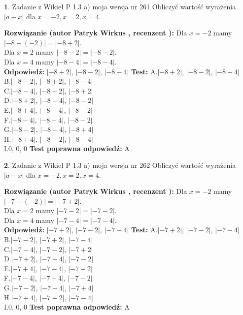 \documentclass[12pt, a4paper]{article}
\theoremstyle{definition} %
\newtheorem{zad}{}
\newcommand{\zadStart}[1]{\begin{zad}#1\newline}
\newcommand{\zadStop}{\end{zad}}
\newcommand{\rozwStart}[2]{\noindent \textbf{Rozwiązanie (autor #1 , recenzent #2): }\newline}
\newcommand{\rozwStop}{\newline}
\newcommand{\odpStart}{\noindent \textbf{Odpowiedź:}\newline}
\newcommand{\odpStop}{\newline}
\newcommand{\testStart}{\noindent \textbf{Test:}\newline}
\newcommand{\testStop}{\newline}
\newcommand{\kluczStart}{\noindent \textbf{Test poprawna odpowiedź:}\newline}
\newcommand{\kluczStop}{\newline}
\begin{document}
\zadStart{Zadanie z Wikieł P 1.3 a) moja wersja nr 261}
Obliczyć wartość wyrażenia $|a - x|$ dla $x=-2,x=2,x=4$.
\zadStop
\rozwStart{Patryk Wirkus}{}
Dla $x = -2$ mamy $|-8 - (-2)| = |-8 + 2|$.\\
Dla $x = 2$ mamy $|-8 - 2| = |-8 - 2|$.\\
Dla $x = 4$ mamy $|-8 - 4| = |-8 - 4|$.\\
\rozwStop
\odpStart
$|-8 + 2|$, $|-8 - 2|$, $|-8 - 4|$
\odpStop
\testStart
A.$|-8 + 2|$, $|-8 - 2|$, $|-8 - 4|$\\
B.$|-8 - 2|$, $|-8 + 2|$, $|-8 - 4|$\\
C.$|-8 - 4|$, $|-8 - 2|$, $|-8 + 2|$\\
D.$|-8 + 2|$, $|-8 - 4|$, $|-8 - 2|$\\
E.$|-8 + 4|$, $|-8 - 4|$, $|-8 - 2|$\\
F.$|-8 - 4|$, $|-8 + 4|$, $|-8 - 2|$\\
G.$|-8 - 2|$, $|-8 - 4|$, $|-8 + 4|$\\
H.$|-8 + 4|$, $|-8 - 2|$, $|-8 - 4|$\\
I.$0$, $0$, $0$
\testStop
\kluczStart
A
\kluczStop



\zadStart{Zadanie z Wikieł P 1.3 a) moja wersja nr 262}
Obliczyć wartość wyrażenia $|a - x|$ dla $x=-2,x=2,x=4$.
\zadStop
\rozwStart{Patryk Wirkus}{}
Dla $x = -2$ mamy $|-7 - (-2)| = |-7 + 2|$.\\
Dla $x = 2$ mamy $|-7 - 2| = |-7 - 2|$.\\
Dla $x = 4$ mamy $|-7 - 4| = |-7 - 4|$.\\
\rozwStop
\odpStart
$|-7 + 2|$, $|-7 - 2|$, $|-7 - 4|$
\odpStop
\testStart
A.$|-7 + 2|$, $|-7 - 2|$, $|-7 - 4|$\\
B.$|-7 - 2|$, $|-7 + 2|$, $|-7 - 4|$\\
C.$|-7 - 4|$, $|-7 - 2|$, $|-7 + 2|$\\
D.$|-7 + 2|$, $|-7 - 4|$, $|-7 - 2|$\\
E.$|-7 + 4|$, $|-7 - 4|$, $|-7 - 2|$\\
F.$|-7 - 4|$, $|-7 + 4|$, $|-7 - 2|$\\
G.$|-7 - 2|$, $|-7 - 4|$, $|-7 + 4|$\\
H.$|-7 + 4|$, $|-7 - 2|$, $|-7 - 4|$\\
I.$0$, $0$, $0$
\testStop
\kluczStart
A
\kluczStop
\end{document}
